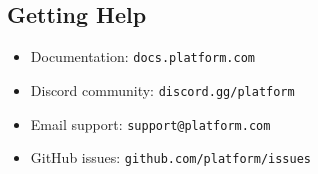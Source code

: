 \documentclass[a4paper,13pt,twoside]{report}
\theoremstyle{definition}
\begin{document}
\subsection{Getting Help}

\begin{itemize}
    \item Documentation: \texttt{docs.platform.com}
    \item Discord community: \texttt{discord.gg/platform}
    \item Email support: \texttt{support@platform.com}
    \item GitHub issues: \texttt{github.com/platform/issues}
\end{itemize}

\newpage
\printbibliography
\end{document}
